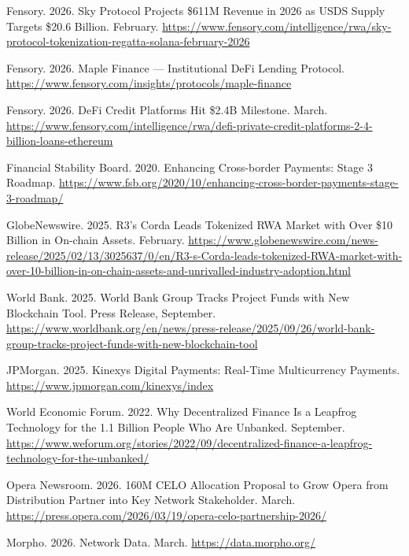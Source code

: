 \documentclass[12pt,a4paper]{report}
\begin{document}
{\begin{enumerate}[label={[\arabic*]}]
\item Fensory. 2026. Sky Protocol Projects \$611M Revenue in 2026 as USDS Supply Targets \$20.6 Billion. February. \url{https://www.fensory.com/intelligence/rwa/sky-protocol-tokenization-regatta-solana-february-2026}


\item Fensory. 2026. Maple Finance --- Institutional DeFi Lending Protocol. \url{https://www.fensory.com/insights/protocols/maple-finance}


\item Fensory. 2026. DeFi Credit Platforms Hit \$2.4B Milestone. March. \url{https://www.fensory.com/intelligence/rwa/defi-private-credit-platforms-2-4-billion-loans-ethereum}


\item Financial Stability Board. 2020. Enhancing Cross-border Payments: Stage 3 Roadmap. \url{https://www.fsb.org/2020/10/enhancing-cross-border-payments-stage-3-roadmap/}


\item GlobeNewswire. 2025. R3's Corda Leads Tokenized RWA Market with Over \$10 Billion in On-chain Assets. February. \url{https://www.globenewswire.com/news-release/2025/02/13/3025637/0/en/R3-s-Corda-leads-tokenized-RWA-market-with-over-10-billion-in-on-chain-assets-and-unrivalled-industry-adoption.html}


\item World Bank. 2025. World Bank Group Tracks Project Funds with New Blockchain Tool. Press Release, September. \url{https://www.worldbank.org/en/news/press-release/2025/09/26/world-bank-group-tracks-project-funds-with-new-blockchain-tool}


\item JPMorgan. 2025. Kinexys Digital Payments: Real-Time Multicurrency Payments. \url{https://www.jpmorgan.com/kinexys/index}


\item World Economic Forum. 2022. Why Decentralized Finance Is a Leapfrog Technology for the 1.1 Billion People Who Are Unbanked. September. \url{https://www.weforum.org/stories/2022/09/decentralized-finance-a-leapfrog-technology-for-the-unbanked/}


\item Opera Newsroom. 2026. 160M CELO Allocation Proposal to Grow Opera from Distribution Partner into Key Network Stakeholder. March. \url{https://press.opera.com/2026/03/19/opera-celo-partnership-2026/}


\item Morpho. 2026. Network Data. March. \url{https://data.morpho.org/}



\end{enumerate}}
\end{document}
